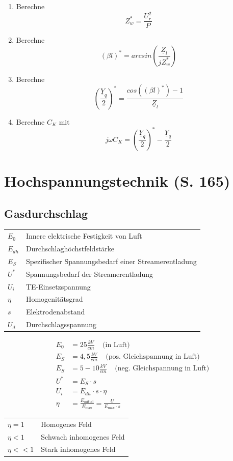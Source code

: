 \documentclass[a4paper,twocolumn,10pt]{article}
\begin{document}
\begin{enumerate}
\item Berechne
\begin{equation*}
Z_w^*=\frac{U_r^2}{P}
\end{equation*}
\item Berechne
\begin{equation*}
(\beta l)^*=arcsin\left(\frac{\underline{Z}_l}{jZ_w^*}\right)
\end{equation*}
\item Berechne
\begin{equation*}
\left(\frac{\underline{Y}_q}{2}\right)^*=\frac{cos\left((\beta l)^*\right)-1}{\underline{Z}_l}
\end{equation*}
\item Berechne $C_K$ mit
\begin{equation*}
j\omega C_K=\left(\frac{\underline{Y}_q}{2}\right)^*-\frac{\underline{Y}_q}{2}
\end{equation*}
\end{enumerate}

\newpage

\section{Hochspannungstechnik (S. 165)}

\subsection{Gasdurchschlag}
\begin{tabular}{ll}
$E_0$ & Innere elektrische Festigkeit von Luft\\
$E_{dh}$ & Durchschlaghöchstfeldstärke\\
$E_S$ & Spezifischer Spannungsbedarf einer Streamerentladung\\
$U^*$ & Spannungsbedarf der Streamerentladung\\
$U_i$ & TE-Einsetzspannung\\
$\eta$ & Homogenitätsgrad\\
$s$ & Elektrodenabstand\\
$U_d$ & Durchschlagsspannung
\end{tabular}
\begin{equation*}
\begin{split}
E_0&= 25\frac{kV}{cm}\;\;\;\;\text{(in Luft)}\\
E_S&=4,5\frac{kV}{cm}\;\;\;\;\text{(pos. Gleichspannung in Luft)}\\
E_S&=5-10\frac{kV}{cm}\;\;\;\;\text{(neg. Gleichspannung in Luft)}\\
U^*&=E_S\cdot s\\
U_i&=E_{dh}\cdot s\cdot \eta\\
\eta &=\frac{E_{\text{mittel}}}{E_{\text{max}}}=\frac{U}{E_{\text{max}}\cdot s}
\end{split}
\end{equation*}
\begin{tabular}{ll}
$\eta =1$ & Homogenes Feld\\
$\eta <1$ & Schwach inhomogenes Feld\\
$\eta <<1$ & Stark inhomogenes Feld
\end{tabular}
\end{document}
